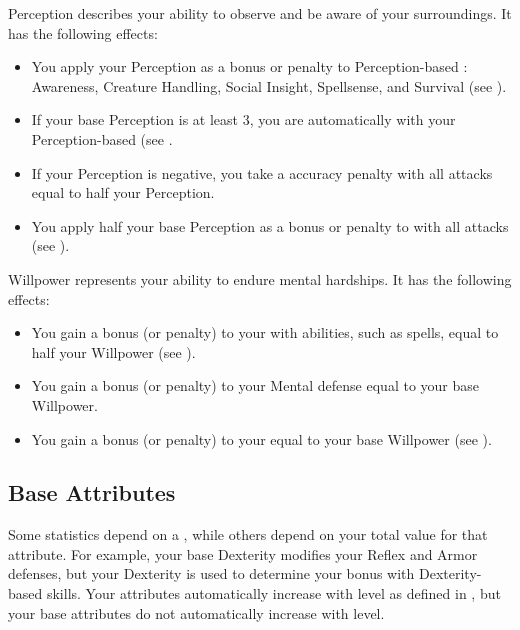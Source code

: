         \label{Perception}
        {
            Perception describes your ability to observe and be aware of your surroundings.
            It has the following effects:
            \begin{itemize}
                \item You apply your Perception as a bonus or penalty to Perception-based : Awareness, Creature Handling, Social Insight, Spellsense, and Survival (see ).
                \item If your base Perception is at least 3, you are automatically  with your Perception-based  (see .
                \item If your Perception is negative, you take a accuracy penalty with all attacks equal to half your Perception.
                \item You apply half your base Perception as a bonus or penalty to  with all attacks (see ).
            \end{itemize}
        }

        \label{Willpower}
        {
            Willpower represents your ability to endure mental hardships.
            It has the following effects:
            \begin{itemize}
                \item You gain a bonus (or penalty) to your  with  abilities, such as spells, equal to half your Willpower (see ).
                \item You gain a bonus (or penalty) to your Mental defense equal to your base Willpower.
                \item You gain a bonus (or penalty) to your  equal to your base Willpower (see ).
            \end{itemize}
        }

    \subsection{Base Attributes}\label{Base Attributes}
        Some statistics depend on a , while others depend on your total value for that attribute.
        For example, your base Dexterity modifies your Reflex and Armor defenses, but your Dexterity is used to determine your bonus with Dexterity-based skills.
        Your attributes automatically increase with level as defined in , but your base attributes do not automatically increase with level.

